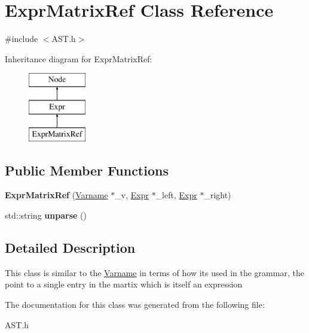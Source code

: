 \hypertarget{classExprMatrixRef}{\section{Expr\-Matrix\-Ref Class Reference}
\label{classExprMatrixRef}
}


{\ttfamily \#include $<$A\-S\-T.\-h$>$}

Inheritance diagram for Expr\-Matrix\-Ref\-:\begin{figure}[H]
\begin{center}
\leavevmode
\includegraphics[height=3.000000cm]{classExprMatrixRef}
\end{center}
\end{figure}
\subsection*{Public Member Functions}
\begin{DoxyCompactItemize}
\item 
\hypertarget{classExprMatrixRef_acb47d15f251aa5e6ec01b5b6b8676c20}{{\bfseries Expr\-Matrix\-Ref} (\hyperlink{classVarname}{Varname} $\ast$\-\_\-v, \hyperlink{classExpr}{Expr} $\ast$\-\_\-left, \hyperlink{classExpr}{Expr} $\ast$\-\_\-right)}\label{classExprMatrixRef_acb47d15f251aa5e6ec01b5b6b8676c20}

\item 
\hypertarget{classExprMatrixRef_a44f50ae1ad2b5b69968e3618fca808b9}{std\-::string {\bfseries unparse} ()}\label{classExprMatrixRef_a44f50ae1ad2b5b69968e3618fca808b9}

\end{DoxyCompactItemize}


\subsection{Detailed Description}
This class is similar to the \hyperlink{classVarname}{Varname} in terms of how its used in the grammar, the  point to a single entry in the martix which is itself an expression 

The documentation for this class was generated from the following file\-:\begin{DoxyCompactItemize}
\item 
A\-S\-T.\-h\end{DoxyCompactItemize}
